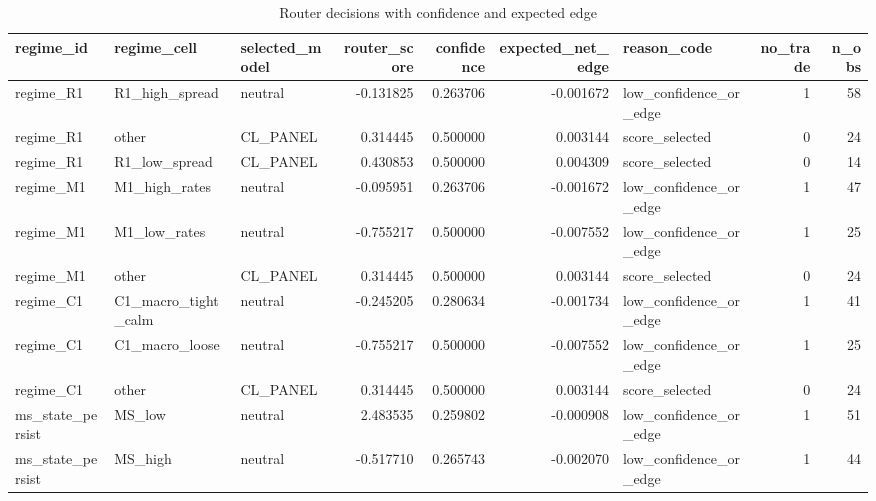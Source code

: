 \begin{table}
\caption{Router decisions with confidence and expected edge}
\label{tab:7_7}
\begin{tabular}{lllrrrlrr}
\toprule
regime_id & regime_cell & selected_model & router_score & confidence & expected_net_edge & reason_code & no_trade & n_obs \\
\midrule
regime_R1 & R1_high_spread & neutral & -0.131825 & 0.263706 & -0.001672 & low_confidence_or_edge & 1 & 58 \\
regime_R1 & other & CL_PANEL & 0.314445 & 0.500000 & 0.003144 & score_selected & 0 & 24 \\
regime_R1 & R1_low_spread & CL_PANEL & 0.430853 & 0.500000 & 0.004309 & score_selected & 0 & 14 \\
regime_M1 & M1_high_rates & neutral & -0.095951 & 0.263706 & -0.001672 & low_confidence_or_edge & 1 & 47 \\
regime_M1 & M1_low_rates & neutral & -0.755217 & 0.500000 & -0.007552 & low_confidence_or_edge & 1 & 25 \\
regime_M1 & other & CL_PANEL & 0.314445 & 0.500000 & 0.003144 & score_selected & 0 & 24 \\
regime_C1 & C1_macro_tight_calm & neutral & -0.245205 & 0.280634 & -0.001734 & low_confidence_or_edge & 1 & 41 \\
regime_C1 & C1_macro_loose & neutral & -0.755217 & 0.500000 & -0.007552 & low_confidence_or_edge & 1 & 25 \\
regime_C1 & other & CL_PANEL & 0.314445 & 0.500000 & 0.003144 & score_selected & 0 & 24 \\
ms_state_persist & MS_low & neutral & 2.483535 & 0.259802 & -0.000908 & low_confidence_or_edge & 1 & 51 \\
ms_state_persist & MS_high & neutral & -0.517710 & 0.265743 & -0.002070 & low_confidence_or_edge & 1 & 44 \\
\bottomrule
\end{tabular}
\end{table}
